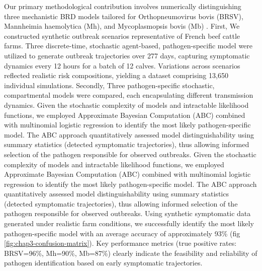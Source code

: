 Our primary methodological contribution involves numerically distinguishing three mechanistic BRD models tailored for Orthopneumovirus bovis (BRSV), Mannheimia haemolytica (Mh), and Mycoplasmopsis bovis (Mb) \cite{sorindupont_modeling_2023}. First, We constructed synthetic outbreak scenarios representative of French beef cattle farms. Three discrete-time, stochastic agent-based, pathogen-specific model  were utilized to generate outbreak trajectories over 277 days, capturing symptomatic dynamics every 12 hours for a batch of 12 calves. Variations across scenarios reflected realistic risk compositions, yielding a dataset comprising 13,650 individual simulations. Secondly, Three pathogen-specific stochastic, compartmental models \cite{sorindupont_modeling_2023} were compared, each encapsulating different transmission dynamics. Given the stochastic complexity of models and intractable likelihood functions, we employed Approximate Bayesian Computation (ABC) combined with multinomial logistic regression to identify the most likely pathogen-specific model. The ABC approach quantitatively assessed model distinguishability using summary statistics (detected symptomatic trajectories), thus allowing informed selection of the pathogen responsible for observed outbreaks. Given the stochastic complexity of models and intractable likelihood functions, we employed Approximate Bayesian Computation (ABC) combined with multinomial logistic regression to identify the most likely pathogen-specific model. The ABC approach quantitatively assessed model distinguishability using summary statistics (detected symptomatic trajectories), thus allowing informed selection of the pathogen responsible for observed outbreaks. Using synthetic symptomatic data generated under realistic farm conditions, we successfully identify the most likely pathogen-specific model with an average accuracy of approximately 93\% (fig \ref{fig:chap3-confusion-matrix}). Key performance metrics (true positive rates: BRSV=96\%, Mh=90\%, Mb=87\%) clearly indicate the feasibility and reliability of pathogen identification based on early symptomatic trajectories.

